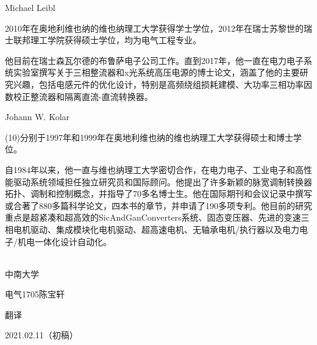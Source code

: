 \documentclass[journal]{IEEEtran}
\begin{document}
\begin{IEEEbiography}{Michael Leibl}

2010年在奥地利维也纳的维也纳理工大学获得学士学位，2012年在瑞士苏黎世的瑞士联邦理工学院获得硕士学位，均为电气工程专业。

他目前在瑞士森瓦尔德的布鲁萨电子公司工作。直到2017年，他一直在电力电子系统实验室撰写关于三相整流器和x光系统高压电源的博士论文，涵盖了他的主要研究兴趣，包括电感元件的优化设计，特别是高频绕组损耗建模、大功率三相功率因数校正整流器和隔离直流-直流转换器。
\end{IEEEbiography}

\begin{IEEEbiography}{Johann W. Kolar}

(10)分别于1997年和1999年在奥地利维也纳的维也纳理工大学获得硕士和博士学位。

自1984年以来，他一直与维也纳理工大学密切合作，在电力电子、工业电子和高性能驱动系统领域担任独立研究员和国际顾问。他提出了许多新颖的脉宽调制转换器拓扑、调制和控制概念，并指导了70多名博士生。他在国际期刊和会议记录中撰写或合著了880多篇科学论文，四本书的章节，并申请了190多项专利。他目前的研究重点是超紧凑和超高效的SicAndGanConverters系统、固态变压器、先进的变速三相电机驱动、集成模块化电机驱动、超高速电机、无轴承电机/执行器以及电力电子/机电一体化设计自动化。

\\

中南大学

电气1705陈宝轩 

翻译

2021.02.11（初稿）

\end{IEEEbiography}
%
\end{document}
